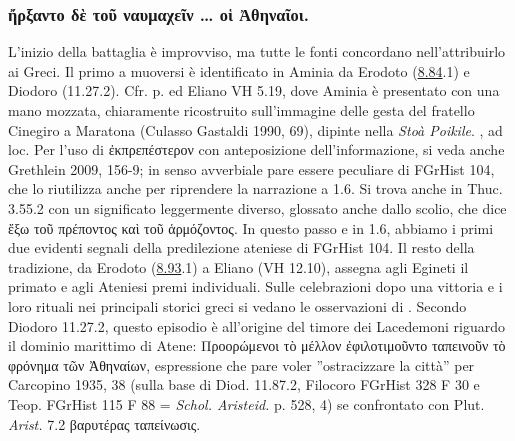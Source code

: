 {\subsubsection{\textgreek{ἤρξαντο δὲ τοῦ ναυμαχεῖν … οἱ Ἀθηναῖοι.}}\label{bkm:RefHeading3610919231068}
L'inizio della battaglia è improvviso, ma tutte le fonti concordano nell'attribuirlo ai Greci. Il primo a muoversi è identificato in Aminia\label{ref:Aminia} da Erodoto (\href{http://data.perseus.org/citations/urn:cts:greekLit:tlg0016.tlg001.perseus-grc1:8.84}{8.84}.1) e  Diodoro (11.27.2). 
Cfr. p.\pageref{aminiacinegiro} ed Eliano VH 5.19, dove Aminia è presentato con una mano mozzata, chiaramente ricostruito sull'immagine delle gesta del fratello Cinegiro a Maratona (Culasso Gastaldi 1990, 69), dipinte nella \emph{Stoà Poikile}. \cite{Pownall2011}, ad loc. 
Per l'uso di  \textgreek{ἐκπρεπέστερον} con anteposizione dell'informazione, si veda anche Grethlein 2009, 156-9; in senso avverbiale pare essere peculiare di FGrHist 104, che lo riutilizza anche per riprendere la narrazione a 1.6. Si trova anche in Thuc. 3.55.2 con un significato leggermente diverso, glossato anche dallo scolio, che dice \textgreek{ἔξω τοῦ πρέποντος καὶ τοῦ ἁρμόζοντος}.  In questo passo e in 1.6, abbiamo i primi due evidenti segnali della predilezione ateniese di FGrHist 104. Il resto della tradizione, da Erodoto (\href{http://data.perseus.org/citations/urn:cts:greekLit:tlg0016.tlg001.perseus-grc1:8.93}{8.93}.1) a Eliano (VH 12.10), assegna agli Egineti il primato e agli Ateniesi  premi individuali. Sulle celebrazioni dopo una vittoria e i loro rituali nei principali storici greci si vedano le osservazioni di \cite{Hau2013}. Secondo  Diodoro 11.27.2, questo episodio è all'origine del timore dei Lacedemoni riguardo il dominio marittimo di Atene: \textgreek{Προορώμενοι τὸ μέλλον ἐφιλοτιμοῦντο ταπεινοῦν τὸ φρόνημα τῶν Ἀθηναίων}, espressione che pare voler ''ostracizzare la città'' per Carcopino 1935, 38 (sulla base di Diod. 11.87.2, Filocoro FGrHist 328 F 30 e Teop. FGrHist 115 F 88 = \emph{Schol. Aristeid.} p. 528, 4) se confrontato con Plut. \emph{Arist.} 7.2 \textgreek{βαρυτέρας ταπείνωσις}.
}
